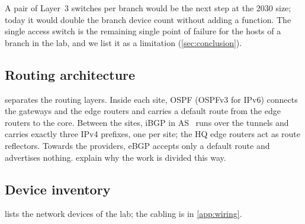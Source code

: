 A pair of Layer~3 switches per branch would be the next step at the 2030 size; today it would double the
branch device count without adding a function. The single access switch is the remaining single point of
failure for the hosts of a branch in the lab, and we list it as a limitation (\cref{sec:conclusion}).


\subsection{Routing architecture}\label{sec:arch-routing}
 separates the routing layers. Inside each site, OSPF (OSPFv3 for IPv6) connects the
gateways and the edge routers and carries a default route from the edge routers to the core. Between the
sites, iBGP in AS~\FactAsTvi{} runs over the tunnels and carries exactly three IPv4 prefixes, one per site;
the HQ edge routers act as route reflectors. Towards the providers, eBGP accepts only a default route and
advertises nothing.  explain why the work is divided this way.


\subsection{Device inventory}\label{sec:arch-devices}
 lists the \FactNumDevices{} network devices of the lab; the cabling is in
\cref{app:wiring}.

